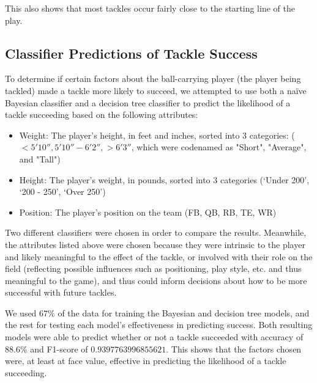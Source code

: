 \documentclass[bibtex, sigconf, hyperref={colorlinks=true,linkcolor=blue,urlcolor=blue}]{acmart}
\begin{document}
This also shows that most tackles occur fairly close to the starting line of the play.

\subsection{Classifier Predictions of Tackle Success}

To determine if certain factors about the ball-carrying player (the player being tackled)
made a tackle more likely to succeed, we attempted to use both a na\"ive Bayesian
classifier and a decision tree classifier to predict the likelihood of a tackle succeeding
based on the following attributes:

\begin{itemize}
\item Weight: The player's height, in feet and inches, sorted into 3 categories: ($< 5'10'',
5'10''-6'2'', > 6'3''$, which were codenamed as "Short", "Average", and "Tall")
\item Height: The player's weight, in pounds, sorted into 3 categories (`Under 200', `200 -
250', `Over 250')
\item Position: The player's position on the team (FB, QB, RB, TE, WR)
\end{itemize}

Two different classifiers were chosen in order to compare the results. Meanwhile,
the attributes listed above were chosen because they were intrinsic to the player
and likely meaningful to the effect of the tackle, or involved with their role on the field
(reflecting possible influences such as positioning, play style, etc. and thus
meaningful to the game), and thus could inform decisions about how to be more successful
with future tackles.

We used $67\%$ of the data for training the Bayesian and decision tree models, and the rest for
testing each model's effectiveness in predicting success. Both resulting models were able to
predict whether or not a tackle succeeded with accuracy of $88.6\%$ and F1-score
of $0.9397763996855621$. This shows that the factors chosen were, at least at face value, effective in
predicting the likelihood of a tackle succeeding.
\end{document}
